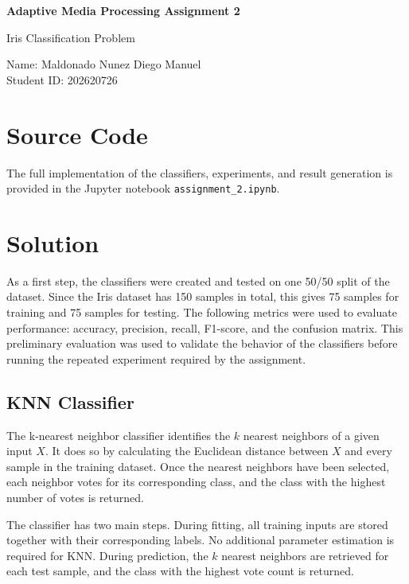 \documentclass[11pt,a4paper]{article}
\begin{document}
\begin{center}
{\LARGE\bfseries Adaptive Media Processing Assignment 2\par}
\vspace{0.5em}
{\Large Iris Classification Problem\par}
\end{center}

\begin{flushleft}
Name: Maldonado Nunez Diego Manuel\\
Student ID: 202620726
\end{flushleft}

\section{Source Code}

The full implementation of the classifiers, experiments, and result generation is provided in the Jupyter notebook \texttt{assignment\_2.ipynb}.

\section{Solution}

As a first step, the classifiers were created and tested on one 50/50 split of the dataset. Since the Iris dataset has 150 samples in total, this gives 75 samples for training and 75 samples for testing. The following metrics were used to evaluate performance: accuracy, precision, recall, F1-score, and the confusion matrix. This preliminary evaluation was used to validate the behavior of the classifiers before running the repeated experiment required by the assignment.

\subsection{KNN Classifier}

The k-nearest neighbor classifier identifies the \(k\) nearest neighbors of a given input \(X\). It does so by calculating the Euclidean distance between \(X\) and every sample in the training dataset. Once the nearest neighbors have been selected, each neighbor votes for its corresponding class, and the class with the highest number of votes is returned.

The classifier has two main steps. During fitting, all training inputs are stored together with their corresponding labels. No additional parameter estimation is required for KNN. During prediction, the \(k\) nearest neighbors are retrieved for each test sample, and the class with the highest vote count is returned.
\end{document}
